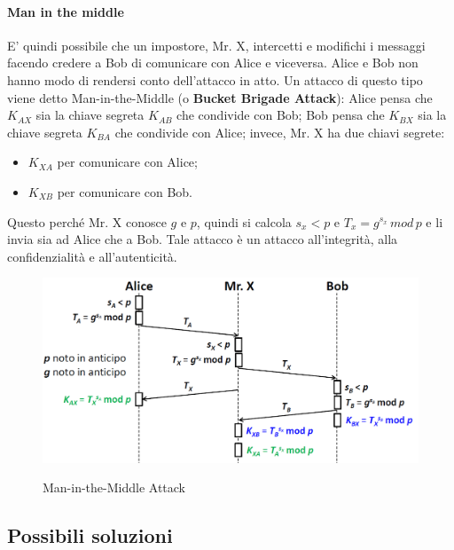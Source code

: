 \paragraph{Man in the middle} 
E' quindi possibile che un impostore, Mr. X, intercetti e modifichi i messaggi facendo credere a Bob di comunicare con Alice e viceversa. Alice e Bob non hanno modo di rendersi conto dell'attacco in atto. 
\newline \newline
Un attacco di questo tipo viene detto Man-in-the-Middle (o \textbf{Bucket Brigade Attack}): Alice pensa che $K_{AX}$ sia la chiave segreta $K_{AB}$ che condivide con Bob; Bob pensa che $K_{BX}$ sia la chiave segreta $K_{BA}$ che condivide con Alice; invece, Mr. X ha due chiavi segrete: 
\begin{itemize}
\item $K_{XA}$ per comunicare con Alice;
\item $K_{XB}$ per comunicare con Bob.
\end{itemize}
Questo perché Mr. X conosce $g$ e $p$, quindi si calcola $s_{x}<p$ e $T_{x}=g^{s_{x}} \, mod \, p$ e li invia sia ad Alice che a Bob. Tale attacco è un attacco all'integrità, alla confidenzialità e all'autenticità.
\begin{figure}[htbp]
	\centering%
	\subfigure%
	{\includegraphics[scale=0.5, keepaspectratio]{Immagini/chiave_pubblica/DiffieHellman_maninthemiddle.png}}
	\caption{Man-in-the-Middle Attack}
\end{figure}

\subsection{Possibili soluzioni}
